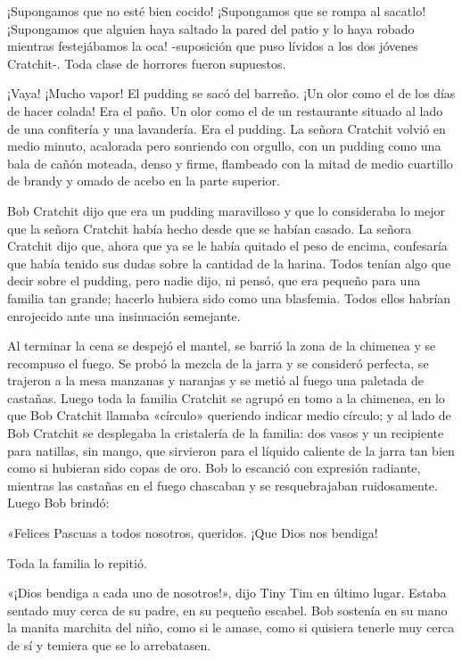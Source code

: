 \documentclass{novela}
\begin{document}
 ¡Supongamos que no esté bien cocido! ¡Supongamos que se rompa al sacatlo! ¡Supongamos que alguien haya saltado la pared del patio y lo haya robado mientras festejábamos la oca! -suposición que puso lívidos a los dos jóvenes Cratchit-. Toda clase de horrores fueron supuestos.

 ¡Vaya! ¡Mucho vapor! El pudding se sacó del barreño. ¡Un olor como el de los días de hacer colada! Era el paño. Un olor como el de un restaurante situado al lado de una confitería y una lavandería. Era el pudding. La señora Cratchit volvió en medio minuto, acalorada pero sonriendo con orgullo, con un pudding como una bala de cañón moteada, denso y firme, flambeado con la mitad de medio cuartillo de brandy y omado de acebo en la parte superior.

 Bob Cratchit dijo que era un pudding maravilloso y que lo consideraba lo mejor que la señora Cratchit había hecho desde que se habían casado. La señora Cratchit dijo que, ahora que ya se le había quitado el peso de encima, confesaría que había tenido sus dudas sobre la cantidad de la harina. Todos tenían algo que decir sobre el pudding, pero nadie dijo, ni pensó, que era pequeño para una familia tan grande; hacerlo hubiera sido como una blasfemia. Todos ellos habrían enrojecido ante una insinuación semejante.

 Al terminar la cena se despejó el mantel, se barrió la zona de la chimenea y se recompuso el fuego. Se probó la mezcla de la jarra y se consideró perfecta, se trajeron a la mesa manzanas y naranjas y se metió al fuego una paletada de castañas. Luego toda la familia Cratchit se agrupó en tomo a la chimenea, en lo que Bob Cratchit llamaba «círculo» queriendo indicar medio círculo; y al lado de Bob Cratchit se desplegaba la cristalería de la familia: dos vasos y un recipiente para natillas, sin mango, que sirvieron para el líquido caliente de la jarra tan bien como si hubieran sido copas de oro. Bob lo escanció con expresión radiante, mientras las castañas en el fuego chascaban y se resquebrajaban ruidosamente. Luego Bob brindó:

 «Felices Pascuas a todos nosotros, queridos. ¡Que Dios nos bendiga!

 Toda la familia lo repitió.

 «¡Dios bendiga a cada uno de nosotros!», dijo Tiny Tim en último lugar. Estaba sentado muy cerca de su padre, en su pequeño escabel. Bob sostenía en su mano la manita marchita del niño, como si le amase, como si quisiera tenerle muy cerca de sí y temiera que se lo arrebatasen.
\end{document}
